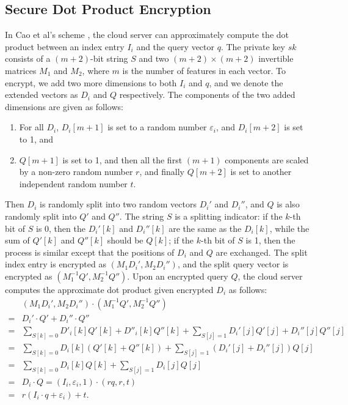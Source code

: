 \documentclass{article}
\begin{document}
\subsection{Secure Dot Product Encryption}
In Cao et al's scheme \cite{Cao14}, the cloud server can approximately compute the dot product between an index entry $I_i$ and the query vector $q$. The private key $sk$ consists of a $(m+2)$-bit string $S$ and two $(m+2)\times (m+2)$ invertible matrices $M_1$ and $M_2$, where $m$ is the number of features in each vector. To encrypt, we add two more dimensions to both $I_i$ and $q$, and we denote the extended vectors as $D_i$ and $Q$ respectively. The components of the two added dimensions are given as follows: 
\begin{enumerate}
\item For all $D_i$, $D_i[m+1]$ is set to a random number $\varepsilon_i$, and $D_i[m+2]$ is set to 1, and
\item $Q[m+1]$ is set to 1, and then all the first $(m+1)$ components are scaled by a non-zero random number $r$, and finally $Q[m+2]$ is set to another independent random number $t$. 
\end{enumerate}
Then $D_i$ is randomly split into two random vectors $D_i'$ and $D_i''$, and $Q$ is also randomly split into $Q'$ and $Q''$. The string $S$ is a splitting indicator: if the $k$-th bit of $S$ is 0, then the $D_i'[k]$ and $D_i''[k]$ are the same as the $D_i[k]$, while the sum of $Q'[k]$ and $Q''[k]$ should be $Q[k]$; if the $k$-th bit of $S$ is 1, then the process is similar except that the positions of $D_i$ and $Q$ are exchanged. The split index entry is encrypted as $(M_1D_i', M_2D_i'')$, and the split query vector is encrypted as $(M_1^{-1}Q', M_2^{-1}Q'')$. Upon an encrypted query $Q$, the cloud server computes the approximate dot product given encrypted $D_i$ as follows:
\begin{equation*}
\begin{aligned}
&(M_1D_i', M_2D_i'')\cdot(M_1^{-1}Q', M_2^{-1}Q'') \\
=&D_i'\cdot Q' + D_i''\cdot Q''\\
=&\sum_{S[k]=0}D'_i[k] Q'[k] + D''_i[k] Q''[k] + \sum_{S[j]=1} D_i'[j] Q'[j] + D_i''[j] Q''[j]\\
=&\sum_{S[k]=0}D_i[k](Q'[k] + Q''[k]) + \sum_{S[j]=1} (D_i'[j]+ D_i''[j])Q[j]\\
=&\sum_{S[k]=0}D_i[k]Q[k] + \sum_{S[j]=1} D_i[j]Q[j]\\
=&D_i \cdot Q = (I_i,\varepsilon_i,1)\cdot (rq,r,t)\\
=&r(I_i\cdot q+\varepsilon_i)+t.
\end{aligned}
\end{equation*}
\end{document}
